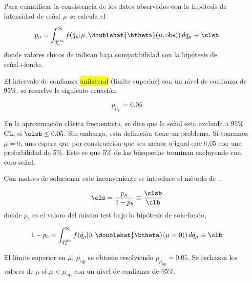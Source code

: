 Para cuantificar la consistencia de los datos observados con la hipótesis de
intensidad de se\~nal $\mu$ se calcula el {\pvalue}

\begin{equation}
  p_\mu = \int_{\tilde{q}_\mu^\text{obs}}^{\infty} f(\tilde{q}_\mu|\mu,\doublehat{\btheta}(\mu, \text{obs})) \, d\tilde{q}_\mu \equiv \clsb
  \label{eq:pmu}
\end{equation}
%
donde valores chicos de {\clsb} indican baja compatibilidad con la hipótesis
de señal+fondo.

El intervalo de confianza \hl{unilateral} (limite superior) con un nivel de
confianza de 95\%, se resuelve la siguiente ecuación:

\begin{equation}
  p_{\mu_\text{U}} = 0.05
\end{equation}

En la aproximación clásica frecuentista, se dice que la
señal esta excluida a 95\% CL, si ${\clsb} \leq 0.05$. Sin embargo, esta
definición tiene un problema. Si tomamos $\mu=0$, uno espera que por construcción
que {\clsb} sea menor o igual que 0.05 con una probabilidad de 5\%. Esto es que
5\% de las búsquedas terminan excluyendo con cero señal.

Con motivo de solucionar este inconveniente se introduce el método de {\cls}.


\begin{equation}
  \cls = \frac{p_\mu}{1-p_b}  \equiv \frac{\clsb}{\clb}
\end{equation}
%
donde $p_b$ es el valoro del mismo test bajo la hipótesis de solo-fondo,

\begin{equation}
  1 - p_b = \int_{\tilde{q}_\mu^\text{obs}}^{\infty}
  f(\tilde{q}_\mu|0,\doublehat{\btheta}(\mu=0)) \, d\tilde{q}_\mu \equiv \clb
\end{equation}


El límite superior {\cls} en $\mu$, $\mu_\text{up}$ se obtiene resolviendo
$p_{\mu_\text{up}} = 0.05$. Se rechazan los valores de $\mu$ si $\mu <
\mu_\text{up}$ con un nivel de confianza de 95\%.

